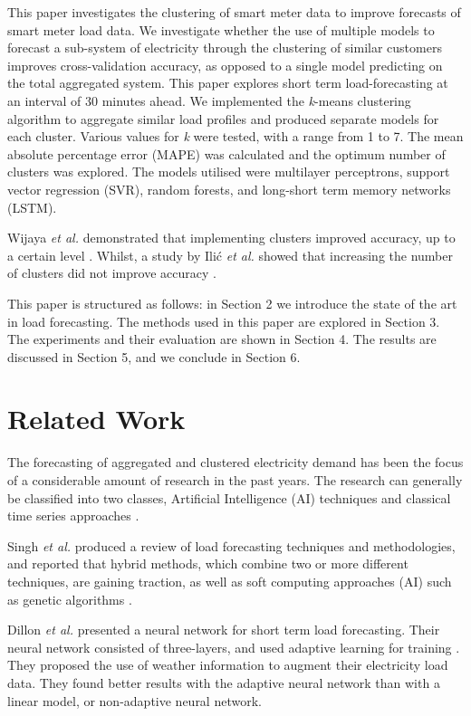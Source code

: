 This paper investigates the clustering of smart meter data to improve forecasts of smart meter load data. We investigate whether the use of multiple models to forecast a sub-system of electricity through the clustering of similar customers improves cross-validation accuracy, as opposed to a single model predicting on the total aggregated system. This paper explores short term load-forecasting  at an interval of 30 minutes ahead. We implemented the \textit{k}-means clustering algorithm to aggregate similar load profiles and produced separate models for each cluster. Various values for \textit{k} were tested, with a range from 1 to 7. The mean absolute percentage error (MAPE) was calculated and the optimum number of clusters was explored. The models utilised were multilayer perceptrons, support vector regression (SVR), random forests, and long-short term memory networks (LSTM).

Wijaya \textit{et al.} demonstrated that implementing clusters improved accuracy, up to a certain level \cite{Wijaya2010}. Whilst, a study by Ili\'c \textit{et al.} showed that increasing the number of clusters did not improve accuracy \cite{Ilic2013}.

This paper is structured as follows: in Section 2 we introduce the state of the art in load forecasting. The methods used in this paper are explored in Section 3. The experiments and their evaluation are shown in Section 4. The results are discussed in Section 5, and we conclude in Section 6.

\section{Related Work}

The forecasting of aggregated and clustered electricity demand has been the focus of a considerable amount of research in the past years. The research can generally be classified into two classes, Artificial Intelligence (AI) techniques \cite{Kim2000, Tiong2008,Quilumba2014} and classical time series approaches \cite{Nazarko2005ARIMAApproach,Huang2003,Nguyen2017}.

Singh \textit{et al.} produced a review of load forecasting techniques and methodologies, and reported that hybrid methods, which combine two or more different techniques, are gaining traction, as well as soft computing approaches (AI) such as genetic algorithms \cite{Singh2012}.

Dillon \textit{et al.} presented a neural network for short term load forecasting. Their neural network consisted of three-layers, and used adaptive learning for training \cite{Dillon1991}. They proposed the use of weather information to augment their electricity load data. They found better results with the adaptive neural network than with a linear model, or non-adaptive neural network. 

